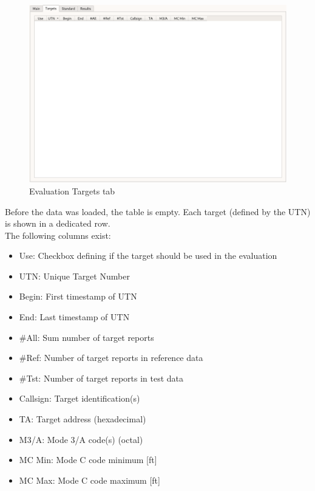 \begin{figure}[H]
  \hspace*{-2cm}
    \includegraphics[width=18cm,frame]{figures/eval_targets_empty.png}
  \caption{Evaluation Targets tab}
\end{figure}

Before the data was loaded, the table is empty. Each target (defined by the UTN) is shown in a dedicated row. \\

The following columns exist:

\begin{itemize}  
\item Use: Checkbox defining if the target should be used in the evaluation
\item UTN: Unique Target Number
\item Begin: First timestamp of UTN
\item End: Last timestamp of UTN
\item \#All: Sum number of target reports
\item \#Ref: Number of target reports in reference data
\item \#Tst: Number of target reports in test data
\item Callsign: Target identification(s)
\item TA: Target address (hexadecimal)
\item M3/A: Mode 3/A code(s) (octal)
\item MC Min: Mode C code minimum [ft]
\item MC Max: Mode C code maximum [ft]
\end{itemize}
\ \\

